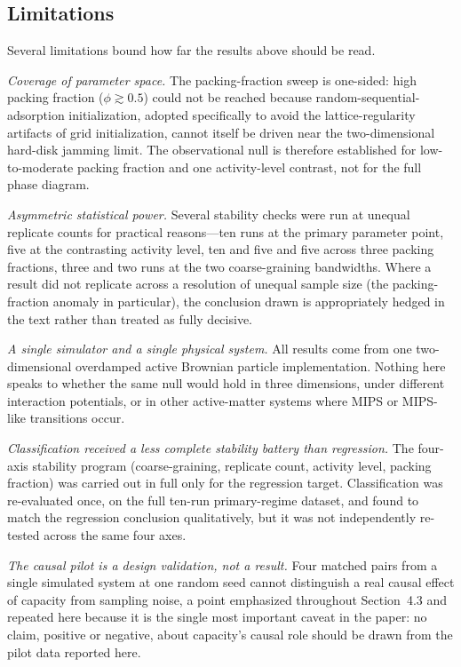 \documentclass[11pt]{article}
\begin{document}
\subsection{Limitations}

Several limitations bound how far the results above should be read.

\emph{Coverage of parameter space.} The packing-fraction sweep is one-sided: high packing fraction ($\phi \gtrsim 0.5$) could not be reached because random-sequential-adsorption initialization, adopted specifically to avoid the lattice-regularity artifacts of grid initialization, cannot itself be driven near the two-dimensional hard-disk jamming limit. The observational null is therefore established for low-to-moderate packing fraction and one activity-level contrast, not for the full phase diagram.

\emph{Asymmetric statistical power.} Several stability checks were run at unequal replicate counts for practical reasons---ten runs at the primary parameter point, five at the contrasting activity level, ten and five and five across three packing fractions, three and two runs at the two coarse-graining bandwidths. Where a result did not replicate across a resolution of unequal sample size (the packing-fraction anomaly in particular), the conclusion drawn is appropriately hedged in the text rather than treated as fully decisive.

\emph{A single simulator and a single physical system.} All results come from one two-dimensional overdamped active Brownian particle implementation. Nothing here speaks to whether the same null would hold in three dimensions, under different interaction potentials, or in other active-matter systems where MIPS or MIPS-like transitions occur.

\emph{Classification received a less complete stability battery than regression.} The four-axis stability program (coarse-graining, replicate count, activity level, packing fraction) was carried out in full only for the regression target. Classification was re-evaluated once, on the full ten-run primary-regime dataset, and found to match the regression conclusion qualitatively, but it was not independently re-tested across the same four axes.

\emph{The causal pilot is a design validation, not a result.} Four matched pairs from a single simulated system at one random seed cannot distinguish a real causal effect of capacity from sampling noise, a point emphasized throughout Section~4.3 and repeated here because it is the single most important caveat in the paper: no claim, positive or negative, about capacity's causal role should be drawn from the pilot data reported here.
\end{document}
